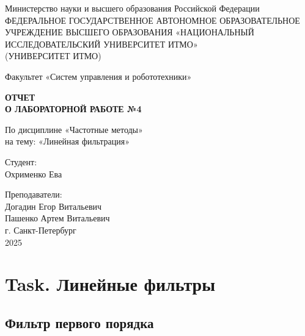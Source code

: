 \documentclass[a4paper,12pt]{article}
\begin{document}
	\begin{titlepage}
		\centering
		\vspace*{1cm}
		
		{\large Министерство науки и высшего образования Российской Федерации}\\
		{\large ФЕДЕРАЛЬНОЕ ГОСУДАРСТВЕННОЕ АВТОНОМНОЕ ОБРАЗОВАТЕЛЬНОЕ УЧРЕЖДЕНИЕ ВЫСШЕГО ОБРАЗОВАНИЯ «НАЦИОНАЛЬНЫЙ ИССЛЕДОВАТЕЛЬСКИЙ УНИВЕРСИТЕТ ИТМО»}\\
		{\large (УНИВЕРСИТЕТ ИТМО)}\\
		
		\vspace{2cm}
		
		{\large Факультет «Систем управления и робототехники»}\\
		
		\vspace{3cm}
		
		\textbf{{\Huge ОТЧЕТ}\\
			{\Huge О ЛАБОРАТОРНОЙ РАБОТЕ №4}}\\
		
		\vspace{1cm}
		
		{\LARGE По дисциплине «Частотные методы»}\\
		{\LARGE на тему: «Линейная фильтрация»}\\
		
		\vspace{3cm}
		
		{\Large Студент:}\\
		Охрименко Ева
		
		\vspace{2cm}
		
		{\Large Преподаватели:}\\
		Догадин Егор Витальевич\\
		Пашенко Артем Витальевич\\
		
		\vspace{3cm}
		{\large г. Санкт-Петербург}\\
		{\large 2025}
		
	\end{titlepage}
	\newpage
	\tableofcontents
	\newpage

	\section{Task. Линейные фильтры}
	\subsection{Фильтр первого порядка}
	
\end{document}
